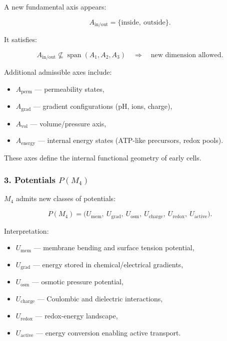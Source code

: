 A new fundamental axis appears:

\[
A_{\mathrm{in/out}} = \{ \text{inside},\ \text{outside} \}.
\]

It satisfies:

\[
A_{\mathrm{in/out}} \not\subseteq \operatorname{span}(A_1, A_2, A_3)
\quad\Rightarrow\quad
\text{new dimension allowed}.
\]

Additional admissible axes include:

\begin{itemize}
    \item $A_{\mathrm{perm}}$ — permeability states,
    \item $A_{\mathrm{grad}}$ — gradient configurations (pH, ions, charge),
    \item $A_{\mathrm{vol}}$ — volume/pressure axis,
    \item $A_{\mathrm{energy}}$ — internal energy states 
          (ATP-like precursors, redox pools).
\end{itemize}

These axes define the internal functional geometry of early cells.

\subsubsection*{3. Potentials \texorpdfstring{$P(M_4)$}{P(M_4)}}

$M_4$ admits new classes of potentials:

\[
P(M_4) =
\big(
U_{\mathrm{mem}},\ 
U_{\mathrm{grad}},\
U_{\mathrm{osm}},\
U_{\mathrm{charge}},\
U_{\mathrm{redox}},\
U_{\mathrm{active}}
\big).
\]

Interpretation:

\begin{itemize}
    \item $U_{\mathrm{mem}}$ — membrane bending and surface tension potential,
    \item $U_{\mathrm{grad}}$ — energy stored in chemical/electrical gradients,
    \item $U_{\mathrm{osm}}$ — osmotic pressure potential,
    \item $U_{\mathrm{charge}}$ — Coulombic and dielectric interactions,
    \item $U_{\mathrm{redox}}$ — redox-energy landscape,
    \item $U_{\mathrm{active}}$ — energy conversion enabling active transport.
\end{itemize}

